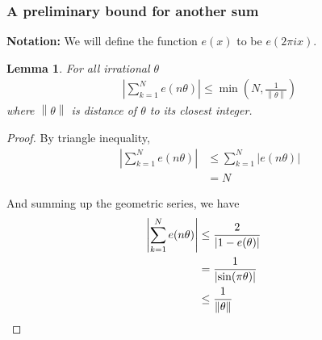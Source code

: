 \documentclass[12pt, titlepage]{article}
\newtheorem{lem}[thm]{Lemma}
\theoremstyle{definition}
\newcommand{\norm}[1]{\left\lVert#1\right\rVert}
\begin{document}
\subsubsection{A preliminary bound for another sum}
\textbf{Notation:} We will define the function $e(x)$ to be $e(2\pi i x)$.

\begin{lem}
    For all irrational $\theta$
    \begin{align}
    \displaystyle \left| \sum_{k=1}^{N} e(n\theta) \right| \leq \min\left(N, \frac{1}{\norm{\theta}} \right) \label{bound:1}
    \end{align}
    where $\norm{\theta}$ is distance of $\theta$ to its closest integer.
\end{lem}

\begin{proof}
    By triangle inequality,
    \begin{align*}
        \left| \sum_{k=1}^{N} e(n\theta) \right| & \leq \sum_{k=1}^{N} \left| e(n\theta) \right| \\
        &= N
    \end{align*}
    
    And summing up the geometric series, we have
    \begin{align*}
        \left| \sum_{k=1}^{N} e(n\theta) \right| &\leq \frac{2}{\left| 1- e(\theta) \right|} \\
        &= \frac{1}{\left| \sin(\pi \theta) \right|}\\
        &\leq \frac{1}{\norm{\theta}} &\qedhere
    \end{align*}
\end{proof}
 
\end{document}
